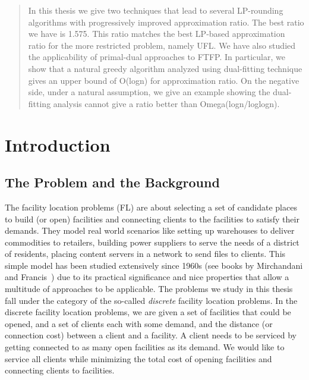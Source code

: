\documentclass[oneside,final]{ucr}
\begin{document}
\begin{frontmatter}
\begin{abstract}
  In this thesis we give two techniques that lead to several
  LP-rounding algorithms with progressively improved
  approximation ratio. The best ratio we have is 1.575. This
  ratio matches the best LP-based approximation ratio for
  the more restricted problem, namely UFL. We have also
  studied the applicability of primal-dual approaches to
  FTFP. In particular, we show that a natural greedy
  algorithm analyzed using dual-fitting technique gives an
  upper bound of O(logn) for approximation ratio. On the
  negative side, under a natural assumption, we give an
  example showing the dual-fitting analysis cannot give a
  ratio better than Omega(logn/loglogn).
\end{abstract}

\tableofcontents
\listoffigures
\listoftables

\end{frontmatter}

\chapter{Introduction} \label{ch: intro}

\section{The Problem and the Background}
The facility location problems (FL) are about selecting a
set of candidate places to build (or open) facilities and
connecting clients to the facilities to satisfy their
demands. They model real world scenarios like setting up
warehouses to deliver commodities to retailers, building
power suppliers to serve the needs of a district of
residents, placing content servers in a network to send
files to clients. This simple model has been studied
extensively since 1960s (see books by Mirchandani and
Francis~\cite{Francis90}) due to its practical significance
and nice properties that allow a multitude of approaches to
be applicable. The problems we study in this thesis fall
under the category of the so-called \emph{discrete} facility
location problems. In the discrete facility location
problems, we are given a set of facilities that could be
opened, and a set of clients each with some demand, and the
distance (or connection cost) between a client and a
facility. A client needs to be serviced by getting connected
to as many open facilities as its demand. We would like to
service all clients while minimizing the total cost of
opening facilities and connecting clients to facilities.
\end{document}
